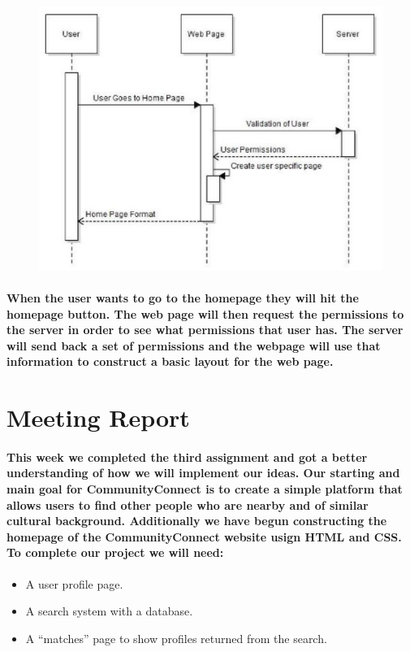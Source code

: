 \documentclass[12pt]{articlei}
\begin{document}
      \begin{figure}[h]
              \includegraphics[width =\linewidth]{sequenceDiagram3.eps}
      \end{figure}

    \paragraph{\normalfont \indent When the user wants to go to the homepage they will hit the homepage button. The web page will then request the permissions to the server in order to see what permissions that user has. The server will send back a set of permissions and the webpage will use that information to construct a basic layout for the web page.
    }

\section{\bf Meeting Report}
  \paragraph{\normalfont \indent This week we completed the third assignment and got a better understanding of how we will implement our ideas. Our starting and main goal for CommunityConnect is to create a simple platform that allows users to find other people who are nearby and of similar cultural background. Additionally we have begun constructing the homepage of the CommunityConnect website usign HTML and CSS. To complete our project we will need:
  }
   \begin{itemize}
    \item A user profile page.
    \item A search system with a database.
    \item A “matches” page to show profiles returned from the search.
   \end{itemize}
\end{document}
